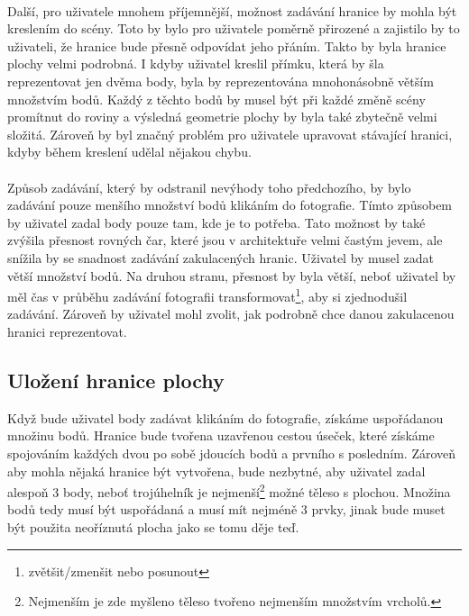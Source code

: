 \documentclass[11pt,twoside,a4paper]{book}
\begin{document}
\paragraph{}
Další, pro uživatele mnohem příjemnější, možnost zadávání hranice by mohla být kreslením do scény. Toto by bylo pro uživatele poměrně přirozené a zajistilo by to uživateli, že hranice bude přesně odpovídat jeho přáním. Takto by byla hranice plochy velmi podrobná. I kdyby uživatel kreslil přímku, která by šla reprezentovat jen dvěma body, byla by reprezentována mnohonásobně větším množstvím bodů. Každý z těchto bodů by musel být při každé změně scény promítnut do roviny a výsledná geometrie plochy by byla také zbytečně velmi složitá. Zároveň by byl značný problém pro uživatele upravovat stávající hranici, kdyby během kreslení udělal nějakou chybu.
\paragraph{}
Způsob zadávání, který by odstranil nevýhody toho předchozího, by bylo zadávání pouze menšího množství bodů klikáním do fotografie. Tímto způsobem by uživatel zadal body pouze tam, kde je to potřeba. Tato možnost by také zvýšila přesnost rovných čar, které jsou v architektuře velmi častým jevem, ale snížila by se snadnost zadávání zakulacených hranic. Uživatel by musel zadat větší množství bodů. Na druhou stranu, přesnost by byla větší, neboť uživatel by měl čas v průběhu zadávání fotografii transformovat\footnote{zvětšit/zmenšit nebo posunout}, aby si zjednodušil zadávání. Zároveň by uživatel mohl zvolit, jak podrobně chce danou zakulacenou hranici reprezentovat. 

\subsection{Uložení hranice plochy}
\label{hraniceUlozeni}
Když bude uživatel body zadávat klikáním do fotografie, získáme uspořádanou množinu bodů. Hranice bude tvořena uzavřenou cestou úseček, které získáme spojováním každých dvou po sobě jdoucích bodů a prvního s posledním.  Zároveň aby mohla nějaká hranice být vytvořena, bude nezbytné, aby uživatel zadal alespoň 3 body, neboť trojúhelník je nejmenší\footnote{Nejmenším je zde myšleno těleso tvořeno nejmenším množstvím vrcholů.} možné těleso s plochou. Množina bodů tedy musí být uspořádaná a musí mít nejméně 3 prvky, jinak bude muset být použita neoříznutá plocha jako se tomu děje teď.
\end{document}
